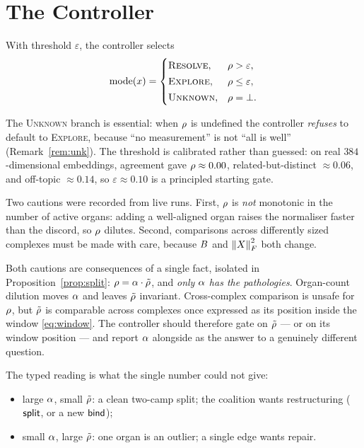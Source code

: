 \chapter{The Controller}\label{ch:controller}

\begin{definition}\label{def:controller}
With threshold $\varepsilon$, the controller selects
\begin{equation}\label{eq:modes}
  \text{mode}(x)=
  \begin{cases}
    \textsc{Resolve}, & \rho>\varepsilon,\\[2pt]
    \textsc{Explore}, & \rho\le\varepsilon,\\[2pt]
    \textsc{Unknown}, & \rho=\bot .
  \end{cases}
\end{equation}
\end{definition}

\begin{remark}\label{rem:controller}
The \textsc{Unknown} branch is essential: when $\rho$ is undefined
the controller \emph{refuses} to default to \textsc{Explore}, because
``no measurement'' is not ``all is well''
(Remark~\ref{rem:unk}). The threshold is calibrated rather than guessed:
on real $384$-dimensional embeddings, agreement gave
$\rho\approx0.00$, related-but-distinct $\approx0.06$, and
off-topic $\approx0.14$, so $\varepsilon\approx0.10$ is a principled
starting gate.

Two cautions were recorded from live runs. First, $\rho$ is
\emph{not} monotonic in the number of active organs: adding a
well-aligned organ raises the normaliser faster than the discord, so
$\rho$ dilutes. Second, comparisons across differently sized
complexes must be made with care, because $B$ and $\left\lVert X \right\rVert_F^2$ both
change.
\end{remark}

\begin{remark}\label{rem:gate-tilde}
Both cautions are consequences of a single fact, isolated in
Proposition~\ref{prop:split}: $\rho=\alpha\cdot\tilde{\rho}$, and
\emph{only $\alpha$ has the pathologies}. Organ-count dilution moves
$\alpha$ and leaves $\tilde{\rho}$ invariant. Cross-complex comparison is
unsafe for $\rho$, but $\tilde{\rho}$ is comparable across complexes
once expressed as its position inside the window \eqref{eq:window}. The
controller should therefore gate on $\tilde{\rho}$ --- or on its window
position --- and report $\alpha$ alongside as the answer to a
genuinely different question.

The typed reading is what the single number could not give:
\begin{itemize}
  \item large $\alpha$, small $\tilde{\rho}$: a clean two-camp split; the
        coalition wants restructuring ($\mathsf{split}$, or a new $\mathsf{bind}$);
  \item small $\alpha$, large $\tilde{\rho}$: one organ is an outlier; a
        single edge wants repair.
\end{itemize}
\end{remark}

